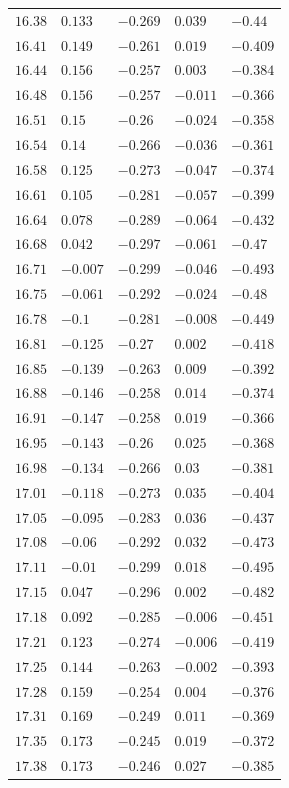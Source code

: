 \begin{table}[h]
\begin{tabular}{rllll}
$16.38$&$0.133$&$-0.269$&$0.039$&$-0.44$\\
$16.41$&$0.149$&$-0.261$&$0.019$&$-0.409$\\
$16.44$&$0.156$&$-0.257$&$0.003$&$-0.384$\\
$16.48$&$0.156$&$-0.257$&$-0.011$&$-0.366$\\
$16.51$&$0.15$&$-0.26$&$-0.024$&$-0.358$\\
$16.54$&$0.14$&$-0.266$&$-0.036$&$-0.361$\\
$16.58$&$0.125$&$-0.273$&$-0.047$&$-0.374$\\
$16.61$&$0.105$&$-0.281$&$-0.057$&$-0.399$\\
$16.64$&$0.078$&$-0.289$&$-0.064$&$-0.432$\\
$16.68$&$0.042$&$-0.297$&$-0.061$&$-0.47$\\
$16.71$&$-0.007$&$-0.299$&$-0.046$&$-0.493$\\
$16.75$&$-0.061$&$-0.292$&$-0.024$&$-0.48$\\
$16.78$&$-0.1$&$-0.281$&$-0.008$&$-0.449$\\
$16.81$&$-0.125$&$-0.27$&$0.002$&$-0.418$\\
$16.85$&$-0.139$&$-0.263$&$0.009$&$-0.392$\\
$16.88$&$-0.146$&$-0.258$&$0.014$&$-0.374$\\
$16.91$&$-0.147$&$-0.258$&$0.019$&$-0.366$\\
$16.95$&$-0.143$&$-0.26$&$0.025$&$-0.368$\\
$16.98$&$-0.134$&$-0.266$&$0.03$&$-0.381$\\
$17.01$&$-0.118$&$-0.273$&$0.035$&$-0.404$\\
$17.05$&$-0.095$&$-0.283$&$0.036$&$-0.437$\\
$17.08$&$-0.06$&$-0.292$&$0.032$&$-0.473$\\
$17.11$&$-0.01$&$-0.299$&$0.018$&$-0.495$\\
$17.15$&$0.047$&$-0.296$&$0.002$&$-0.482$\\
$17.18$&$0.092$&$-0.285$&$-0.006$&$-0.451$\\
$17.21$&$0.123$&$-0.274$&$-0.006$&$-0.419$\\
$17.25$&$0.144$&$-0.263$&$-0.002$&$-0.393$\\
$17.28$&$0.159$&$-0.254$&$0.004$&$-0.376$\\
$17.31$&$0.169$&$-0.249$&$0.011$&$-0.369$\\
$17.35$&$0.173$&$-0.245$&$0.019$&$-0.372$\\
$17.38$&$0.173$&$-0.246$&$0.027$&$-0.385$\\

\end{tabular}
\end{table}
